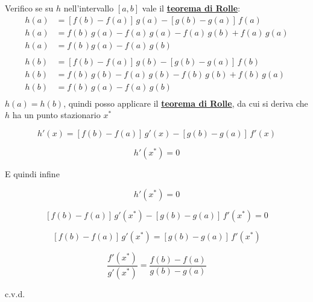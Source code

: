\documentclass[../dimostrazioni]{subfiles}
\begin{document}
            Verifico se su \(h\) nell'intervallo \([a,b]\) vale il \textbf{\hyperref[teoRolle]{teorema di Rolle}}:
            \begin{align*}
                h(a)&=\left[f(b) - f(a)\right] \, g(a) - \left[g(b) - g(a)\right] \, f(a)\\
                h(a)&=f(b) \, g(a) - f(a) \, g(a) - f(a) \, g(b) + f(a) \, g(a)\\
                h(a)&=f(b \, )g(a) - f(a) \, g(b)\\
                \\
                h(b)&=\left[f(b) - f(a)\right] \, g(b) - \left[g(b) - g(a)\right] \, f(b)\\
                h(b)&=f(b) \, g(b) - f(a) \, g(b) - f(b) \, g(b) + f(b) \, g(a)\\
                h(b)&=f(b) \, g(a) - f(a) \, g(b)\\
            \end{align*}
            \(h(a)=h(b)\), quindi posso applicare il \textbf{\hyperref[teoRolle]{teorema di Rolle}}, da cui si deriva che \(h\) ha un punto stazionario \(x^*\)

            \[    h'(x) = \left[f(b) - f(a)\right] \, g'(x) - \left[g(b) - g(a)\right] \, f'(x) \]
            
            \[    h'(x^*) = 0 \]

            E quindi infine

            \[  h'(x^*) = 0 \]
            
            \[  \left[f(b) - f(a)\right] \, g'(x^*) - \left[g(b) - g(a)\right] \, f'(x^*) = 0 \]

            \[  \left[f(b) - f(a)\right] \, g'(x^*) = \left[g(b) - g(a)\right] \, f'(x^*) \]
            
            \[  \frac{ f'(x^*) }{ g'(x^*) } = \frac{ f(b) - f(a) }{ g(b) - g(a) } \]
            
            c.v.d.
\end{document}
